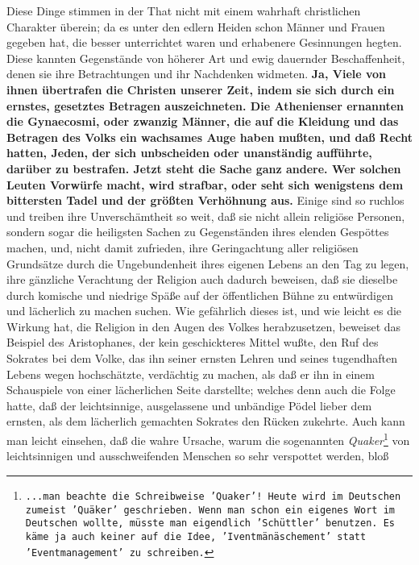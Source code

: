 {Diese Dinge stimmen in der That nicht mit einem wahrhaft christlichen Charakter
überein; da es unter den edlern Heiden schon Männer und
Frauen gegeben hat, die
besser unterrichtet waren und erhabenere Gesinnungen hegten. Diese kannten
Gegenstände von höherer Art und ewig dauernder Beschaffenheit, denen sie ihre
Betrachtungen und ihr Nachdenken widmeten. 
\label{ref:17_08_sittenwaechter}
\textbf{Ja, Viele von ihnen übertrafen die
Christen unserer Zeit, indem sie sich durch ein ernstes, gesetztes Betragen
auszeichneten. Die Athenienser ernannten die Gynaecosmi, oder zwanzig Männer,
die auf die Kleidung und das Betragen des Volks ein wachsames Auge haben mußten,
und daß Recht hatten, Jeden, der sich unbscheiden oder unanständig aufführte,
darüber zu bestrafen. Jetzt steht die Sache ganz andere. Wer solchen Leuten
Vorwürfe macht, wird strafbar, oder seht sich wenigstens dem bittersten Tadel
und der größten Verhöhnung aus.} Einige sind so ruchlos und treiben ihre
Unverschämtheit so weit, daß sie nicht allein religiöse Personen, sondern sogar
die heiligsten Sachen zu Gegenständen ihres elenden Gespöttes machen, und, nicht
damit zufrieden, ihre Geringachtung aller religiösen Grundsätze durch die
Ungebundenheit ihres eigenen Lebens an den Tag zu legen, ihre gänzliche
Verachtung der Religion auch dadurch beweisen, daß sie dieselbe durch komische
und niedrige Späße auf der öffentlichen Bühne zu entwürdigen und lächerlich zu
machen suchen. Wie gefährlich dieses ist, und wie leicht es die Wirkung hat, die
Religion in den Augen des Volkes herabzusetzen, beweiset das Beispiel des
Aristophanes, der kein geschickteres Mittel wußte,
den Ruf des Sokrates bei dem
Volke, das ihn seiner ernsten Lehren und seines tugendhaften Lebens wegen
hochschätzte, verdächtig zu machen, als daß er ihn in einem Schauspiele von
einer lächerlichen Seite darstellte; welches denn auch die Folge hatte, daß der
leichtsinnige, ausgelassene und unbändige Pödel lieber
dem ernsten, als dem
lächerlich gemachten Sokrates den Rücken zukehrte. Auch kann man leicht
einsehen, daß die wahre Ursache, warum die sogenannten
\textit{Quaker}\footnote{\texttt{...man beachte die Schreibweise
'Quaker'! Heute wird im Deutschen zumeist 'Quäker' geschrieben. Wenn man schon ein eigenes Wort im Deutschen wollte, müsste man eigendlich 'Schüttler' benutzen. Es käme ja auch keiner auf die Idee, 'Iventmänäschement' statt 'Eventmanagement' zu schreiben.}} von
leichtsinnigen und ausschweifenden Menschen so sehr verspottet werden, bloß
}
